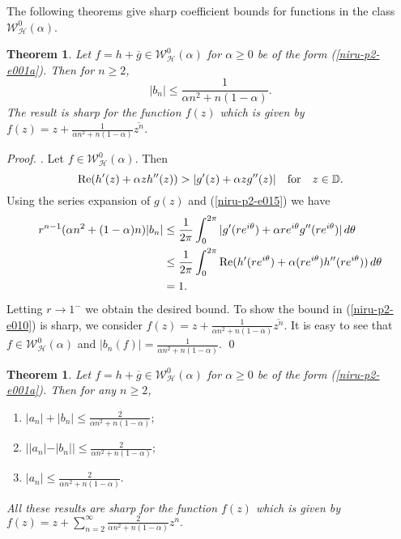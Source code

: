 \documentclass[a4paper,12pt]{amsart}
\theoremstyle{plain}
\newtheorem{thm}[equation]{Theorem}
\theoremstyle{definition}
\newenvironment{pf}[1][]{ \vskip 3mm
 \noindent
 \ifthenelse{\equal{#1}{}}  {{\slshape Proof. }}  {{\slshape #1.} } }{\qed\bigskip}
\begin{document}
The following  theorems give sharp coefficient bounds for  functions in the class $\mathcal{W}^0_{\mathcal{H}}(\alpha)$.

\begin{thm}\label{niru-p2-t010}
Let $f = h + \overline{g} \in \mathcal{W}^0_{\mathcal{H}}(\alpha)$ for $\alpha\geq0$ be of the form (\ref{niru-p2-e001a}). Then for  $n\geq 2$,
\begin{equation}\label{niru-p2-e010}
\displaystyle|b_n|\leq \frac {1}{\alpha n^2 + n(1 - \alpha)}.
\end{equation}
The result is sharp for the function $f(z)$ which is given by $f(z) = z + \frac {1}{\alpha n^2 + n(1 - \alpha)}\overline{z^n}$.
\end{thm}

\begin{pf}
Let $f \in \mathcal{W}^0_{\mathcal{H}}(\alpha)$. Then
\begin{equation}\label{niru-p2-e015}
 {\rm Re}(h'(z) + \alpha z h''(z)) >|g'(z) + \alpha z g''(z)| \quad \mbox{for} \quad z\in\mathbb{D} .
\end{equation}
Using the series expansion of $g(z)$ and (\ref{niru-p2-e015}) we have
\begin{align*}
r^{n-1}(\alpha n^2 + (1 - \alpha) n) |b_n| &\leq \frac{1}{2 \pi}\int_{0}^{2 \pi}|g'(r e^{i \theta}) + \alpha {r e^{i \theta}} g''(r e^{i \theta})|\, d\theta\\
& \leq \frac{1}{2 \pi}\int_{0}^{2 \pi}{\rm Re}(h'(r e^{i \theta}) + \alpha (r e^{i \theta}) h''(r e^{i \theta}))\,d\theta\\
& = 1.
\end{align*}
Letting $r \rightarrow 1^{-}$ we obtain the desired bound.
To show the bound in (\ref{niru-p2-e010}) is sharp, we consider $f(z) = z + \frac {1}{\alpha n^2 + n(1 - \alpha)}\overline{z^n}$. It is easy to see that $f\in\mathcal{W}^0_{\mathcal{H}}(\alpha)$ and $|b_n(f)| = \frac {1}{\alpha n^2 + n(1 - \alpha)}.$
\end{pf}

\begin{thm}\label{niru-p2-t015}
Let $f = h + \overline{g} \in \mathcal{W}^0_{\mathcal{H}}(\alpha)$ for $\alpha\geq0$ be of the form (\ref{niru-p2-e001a}). Then for any $n\geq 2$,
\begin{enumerate}
\item[(i)] $\displaystyle |a_n| + |b_n|\leq \frac {2}{\alpha n^2 + n(1 - \alpha)}; $\\[2mm]

\item[(ii)] $\displaystyle ||a_n| - |b_n||\leq \frac {2}{\alpha n^2 + n(1 - \alpha)};$\\[2mm]

\item[(iii)] $\displaystyle |a_n|\leq \frac {2}{\alpha n^2 + n(1 - \alpha)}.$
\end{enumerate}
All these results are sharp for the function $f(z)$ which is given by $f(z) = z + \sum _{n = 2}^{\infty}\frac{2}{\alpha n^2 + n(1 - \alpha)}z^n.$
\end{thm}
\end{document}
